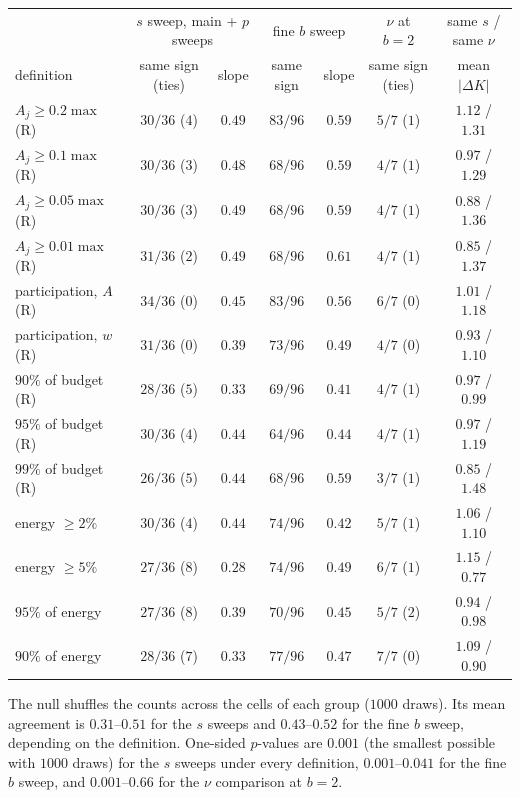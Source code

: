\begin{center}
\scriptsize
\setlength{\tabcolsep}{3.5pt}
\begin{tabular}{lcccccc}
\toprule
& \multicolumn{2}{c}{$s$ sweep, main + $p$ sweeps} & \multicolumn{2}{c}{fine $b$ sweep} & $\nu$ at $b=2$ & same $s$ / same $\nu$\\
definition & same sign (ties) & slope & same sign & slope & same sign (ties) & mean $|\Delta K|$\\
\midrule
$A_j\ge0.2\max$ (R) & $30/36$ ($4$) & $0.49$ & $83/96$ & $0.59$ & $5/7$ ($1$) & $1.12$ / $1.31$\\
$A_j\ge0.1\max$ (R) & $30/36$ ($3$) & $0.48$ & $68/96$ & $0.59$ & $4/7$ ($1$) & $0.97$ / $1.29$\\
$A_j\ge0.05\max$ (R) & $30/36$ ($3$) & $0.49$ & $68/96$ & $0.59$ & $4/7$ ($1$) & $0.88$ / $1.36$\\
$A_j\ge0.01\max$ (R) & $31/36$ ($2$) & $0.49$ & $68/96$ & $0.61$ & $4/7$ ($1$) & $0.85$ / $1.37$\\
participation, $A$ (R) & $34/36$ ($0$) & $0.45$ & $83/96$ & $0.56$ & $6/7$ ($0$) & $1.01$ / $1.18$\\
participation, $w$ (R) & $31/36$ ($0$) & $0.39$ & $73/96$ & $0.49$ & $4/7$ ($0$) & $0.93$ / $1.10$\\
$90\%$ of budget (R) & $28/36$ ($5$) & $0.33$ & $69/96$ & $0.41$ & $4/7$ ($1$) & $0.97$ / $0.99$\\
$95\%$ of budget (R) & $30/36$ ($4$) & $0.44$ & $64/96$ & $0.44$ & $4/7$ ($1$) & $0.97$ / $1.19$\\
$99\%$ of budget (R) & $26/36$ ($5$) & $0.44$ & $68/96$ & $0.59$ & $3/7$ ($1$) & $0.85$ / $1.48$\\
energy $\ge2\%$ & $30/36$ ($4$) & $0.44$ & $74/96$ & $0.42$ & $5/7$ ($1$) & $1.06$ / $1.10$\\
energy $\ge5\%$ & $27/36$ ($8$) & $0.28$ & $74/96$ & $0.49$ & $6/7$ ($1$) & $1.15$ / $0.77$\\
$95\%$ of energy & $27/36$ ($8$) & $0.39$ & $70/96$ & $0.45$ & $5/7$ ($2$) & $0.94$ / $0.98$\\
$90\%$ of energy & $28/36$ ($7$) & $0.33$ & $77/96$ & $0.47$ & $7/7$ ($0$) & $1.09$ / $0.90$\\
\bottomrule
\end{tabular}
\end{center}
The null shuffles the counts across the cells of each group ($1000$ draws). Its mean agreement is $0.31$--$0.51$ for the $s$ sweeps and $0.43$--$0.52$ for the fine $b$ sweep, depending on the definition. One-sided $p$-values are $0.001$ (the smallest possible with $1000$ draws) for the $s$ sweeps under every definition, $0.001$--$0.041$ for the fine $b$ sweep, and $0.001$--$0.66$ for the $\nu$ comparison at $b=2$.
